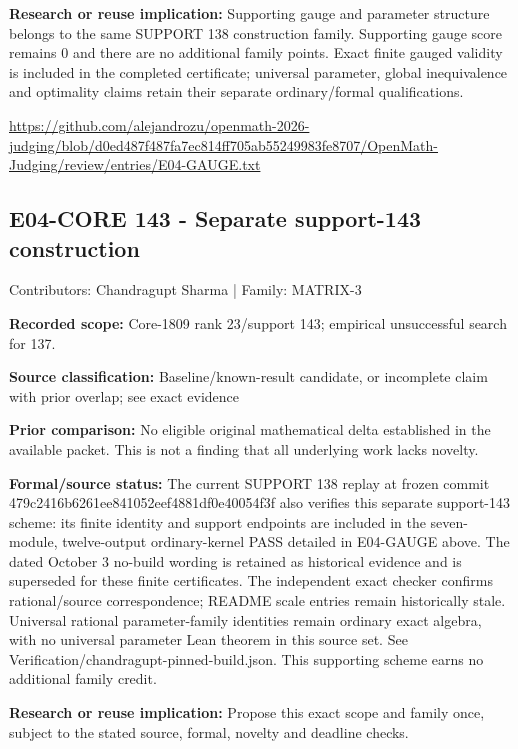 \documentclass[11pt,a4paper]{article}
\begin{document}
\textbf{Research or reuse implication:} Supporting gauge and parameter structure belongs to the same SUPPORT 138 construction family. Supporting gauge score remains 0 and there are no additional family points. Exact finite gauged validity is included in the completed certificate; universal parameter, global inequivalence and optimality claims retain their separate ordinary/formal qualifications.

{\small \url{https://github.com/alejandrozu/openmath-2026-judging/blob/d0ed487f487fa7ec814ff705ab55249983fe8707/OpenMath-Judging/review/entries/E04-GAUGE.txt}\par}

\begin{samepage}
\subsection{E04-CORE 143  -  Separate support-143 construction}
{\small Contributors: Chandragupt Sharma | Family: MATRIX-3\par}

\textbf{Recorded scope:} Core-1809 rank 23/support 143; empirical unsuccessful search for 137.

\end{samepage}
\textbf{Source classification:} Baseline/known-result candidate, or incomplete claim with prior overlap; see exact evidence

\textbf{Prior comparison:} No eligible original mathematical delta established in the available packet. This is not a finding that all underlying work lacks novelty.

\textbf{Formal/source status:} The current SUPPORT 138 replay at frozen commit 479c2416b6261ee841052eef4881df0e40054f3f also verifies this separate support-143 scheme: its finite identity and support endpoints are included in the seven-module, twelve-output ordinary-kernel PASS detailed in E04-GAUGE above. The dated October 3 no-build wording is retained as historical evidence and is superseded for these finite certificates. The independent exact checker confirms rational/source correspondence; README scale entries remain historically stale. Universal rational parameter-family identities remain ordinary exact algebra, with no universal parameter Lean theorem in this source set. See Verification/chandragupt-pinned-build.json. This supporting scheme earns no additional family credit.

\textbf{Research or reuse implication:} Propose this exact scope and family once, subject to the stated source, formal, novelty and deadline checks.
\end{document}
